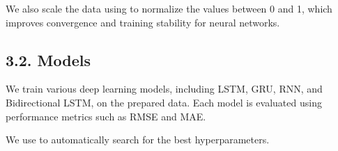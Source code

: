 \documentclass[letterpaper,10pt,english]{sphinxmanual}
\begin{document}
\begin{sphinxVerbatim}[commandchars=\\\{\}]
 
       \PYG{p}{[}\PYG{p}{]} \PYG{p}{[}\PYG{p}{]}
         
        \PYG{p}{[}  \PYG{p}{]}
        \PYG{p}{[}  \PYG{p}{]}
      
\end{sphinxVerbatim}

\sphinxAtStartPar
We also scale the data using  to normalize the values between 0 and 1, which improves convergence and training stability for neural networks.


\subsection{3.2. Models}
\label{\detokenize{index:models}}
\sphinxAtStartPar
We train various deep learning models, including LSTM, GRU, RNN, and Bidirectional LSTM, on the prepared data. Each model is evaluated using performance metrics such as RMSE and MAE.

\sphinxAtStartPar
We use  to automatically search for the best hyperparameters.

\sphinxAtStartPar
{}
\end{document}
